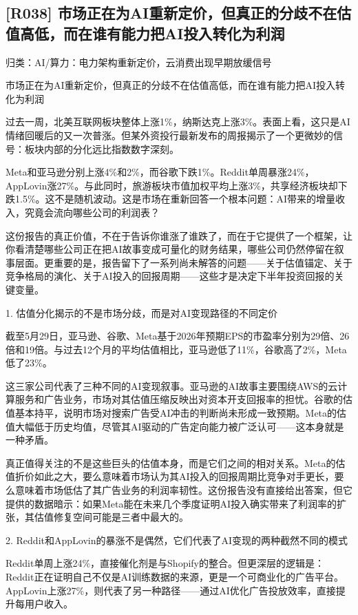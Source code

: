 \documentclass[11pt]{ctexart}
\begin{document}
\subsection{[R038] 市场正在为AI重新定价，但真正的分歧不在估值高低，而在谁有能力把AI投入转化为利润}
{\small\color{refgray}归类：AI/算力：电力架构重新定价，云消费出现早期放缓信号}

市场正在为AI重新定价，但真正的分歧不在估值高低，而在谁有能力把AI投入转化为利润

过去一周，北美互联网板块整体上涨1\%，纳斯达克上涨3\%。表面上看，这只是AI情绪回暖后的又一次普涨。但某外资投行最新发布的周报揭示了一个更微妙的信号：板块内部的分化远比指数数字深刻。

Meta和亚马逊分别上涨4\%和2\%，而谷歌下跌1\%。Reddit单周暴涨24\%，AppLovin涨27\%。与此同时，旅游板块市值加权平均上涨3\%，共享经济板块却下跌1.5\%。这不是随机波动。这是市场在重新回答一个根本问题：AI带来的增量收入，究竟会流向哪些公司的利润表？

这份报告的真正价值，不在于告诉你谁涨了谁跌了，而在于它提供了一个框架，让你看清楚哪些公司正在把AI故事变成可量化的财务结果，哪些公司仍然停留在叙事层面。更重要的是，报告留下了一系列尚未解答的问题——关于估值锚定、关于竞争格局的演化、关于AI投入的回报周期——这些才是决定下半年投资回报的关键变量。

1. 估值分化揭示的不是市场分歧，而是对AI变现路径的不同定价

截至5月29日，亚马逊、谷歌、Meta基于2026年预期EPS的市盈率分别为29倍、26倍和19倍。与过去12个月的平均估值相比，亚马逊低了11\%，谷歌高了2\%，Meta低了23\%。

这三家公司代表了三种不同的AI变现叙事。亚马逊的AI故事主要围绕AWS的云计算服务和广告业务，市场对其估值压缩反映出对资本开支回报率的担忧。谷歌的估值基本持平，说明市场对搜索广告受AI冲击的判断尚未形成一致预期。Meta的估值大幅低于历史均值，尽管其AI驱动的广告定向能力被广泛认可——这本身就是一种矛盾。

真正值得关注的不是这些巨头的估值本身，而是它们之间的相对关系。Meta的估值折价如此之大，要么意味着市场认为其AI投入的回报周期比竞争对手更长，要么意味着市场低估了其广告业务的利润率韧性。这份报告没有直接给出答案，但它提供的数据暗示：如果Meta能在未来几个季度证明AI投入确实带来了利润率的扩张，其估值修复空间可能是三者中最大的。

2. Reddit和AppLovin的暴涨不是偶然，它们代表了AI变现的两种截然不同的模式

Reddit单周上涨24\%，直接催化剂是与Shopify的整合。但更深层的逻辑是：Reddit正在证明自己不仅是AI训练数据的来源，更是一个可商业化的广告平台。AppLovin上涨27\%，则代表了另一种路径——通过AI优化广告投放效率，直接提升每用户收入。
\end{document}
